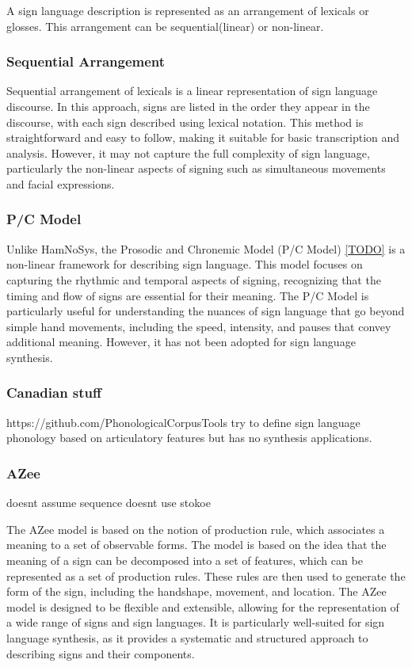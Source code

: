 A sign language description is represented as an arrangement of lexicals or glosses. This arrangement can be sequential(linear) or non-linear.

\subsubsection{Sequential Arrangement}

Sequential arrangement of lexicals is a linear representation of sign language discourse. In this approach, signs are listed in the order they appear in the discourse, with each sign described using lexical notation. This method is straightforward and easy to follow, making it suitable for basic transcription and analysis. However, it may not capture the full complexity of sign language, particularly the non-linear aspects of signing such as simultaneous movements and facial expressions.


\subsubsection{P/C Model}

Unlike HamNoSys, the Prosodic and Chronemic Model (P/C Model) \ref{TODO} is a non-linear framework for describing sign language. This model focuses on capturing the rhythmic and temporal aspects of signing, recognizing that the timing and flow of signs are essential for their meaning. The P/C Model is particularly useful for understanding the nuances of sign language that go beyond simple hand movements, including the speed, intensity, and pauses that convey additional meaning. However, it has not been adopted for sign language synthesis.

\subsubsection{Canadian stuff}

https://github.com/PhonologicalCorpusTools try to define sign language phonology based on articulatory features but has no synthesis applications.

\subsubsection{AZee}

doesnt assume sequence
doesnt use stokoe

The AZee model is based on the notion of production rule, which associates a meaning to a set of observable forms. The model is based on the idea that the meaning of a sign can be decomposed into a set of features, which can be represented as a set of production rules. These rules are then used to generate the form of the sign, including the handshape, movement, and location. The AZee model is designed to be flexible and extensible, allowing for the representation of a wide range of signs and sign languages. It is particularly well-suited for sign language synthesis, as it provides a systematic and structured approach to describing signs and their components.

